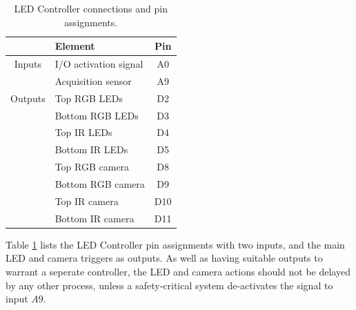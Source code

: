 \documentclass[fleqn,twoside]{article}
\begin{document}
\begin{table}[h]
	\centering
	\caption{LED Controller connections and pin assignments.}
	\label{tab:LED_tasks}
	\begin{tabularx}{0.5\linewidth}{cXc}
		\toprule
		  			& \textbf{Element} & \textbf{Pin} \\[8pt]
		\midrule
		Inputs 		& I/O activation signal & A0 \\[4pt]
		 			& Acquisition sensor 	& A9 \\[4pt]
				
		Outputs		& Top RGB LEDs			& D2  \\[4pt]
					& Bottom RGB LEDs		& D3  \\[4pt]
					& Top IR LEDs			& D4  \\[4pt]
					& Bottom IR LEDs		& D5  \\[4pt]
				 	& Top RGB camera 		& D8  \\[4pt]
					& Bottom RGB camera		& D9  \\[4pt]
					& Top IR camera			& D10  \\[4pt]
					& Bottom IR camera		& D11  \\[4pt]
		\bottomrule
		
	\end{tabularx}
\end{table}
 

Table \ref{tab:LED_tasks} lists the LED Controller pin assignments with two inputs, and the main LED and camera triggers as outputs. As well as having suitable outputs to warrant a seperate controller, the LED and camera actions should not be delayed by any other process, unless a safety-critical system de-activates the signal to input $A9$.
\end{document}
